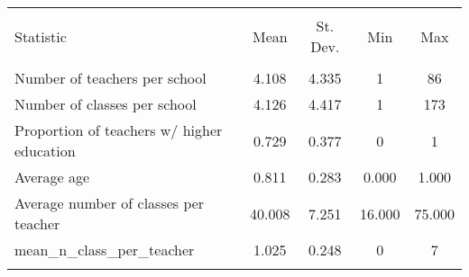 
\begin{tabular}{@{\extracolsep{5pt}}lcccc} 
\\[-1.8ex]\hline 
\hline \\[-1.8ex] 
Statistic & \multicolumn{1}{c}{Mean} & \multicolumn{1}{c}{St. Dev.} & \multicolumn{1}{c}{Min} & \multicolumn{1}{c}{Max} \\ 
\hline \\[-1.8ex] 
Number of teachers per school & 4.108 & 4.335 & 1 & 86 \\ 
Number of classes per school & 4.126 & 4.417 & 1 & 173 \\ 
Proportion of teachers w/ higher education & 0.729 & 0.377 & 0 & 1 \\ 
Average age & 0.811 & 0.283 & 0.000 & 1.000 \\ 
Average number of classes per teacher & 40.008 & 7.251 & 16.000 & 75.000 \\ 
mean\_n\_class\_per\_teacher & 1.025 & 0.248 & 0 & 7 \\ 
\hline \\[-1.8ex] 
\end{tabular} 
